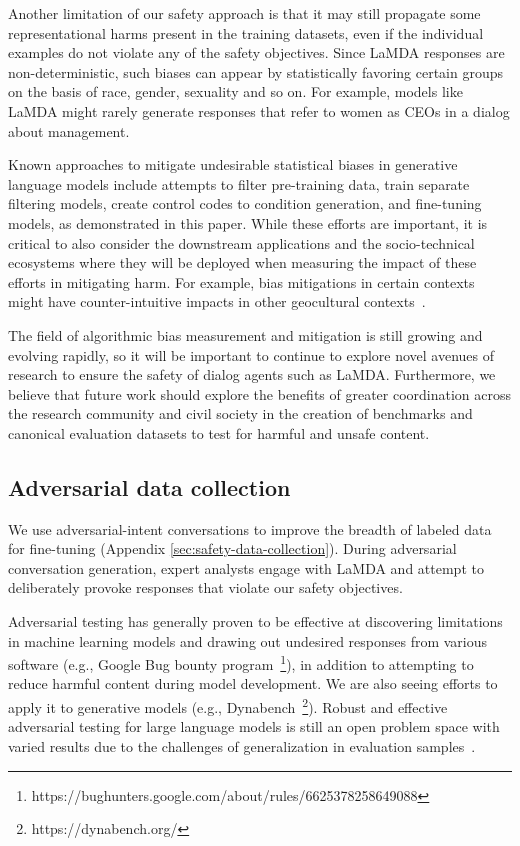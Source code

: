 Another limitation of our safety approach is that it may still propagate some representational harms present in the training datasets, even if the individual examples do not violate any of the safety objectives. Since LaMDA responses are non-deterministic, such biases can appear by statistically favoring certain groups on the basis of race, gender, sexuality and so on. For example, models like LaMDA might rarely generate responses that refer to women as CEOs in a dialog about management.

Known approaches to mitigate undesirable statistical biases in generative language models include attempts to filter pre-training data, train separate filtering models, create control codes to condition generation, and fine-tuning models, as demonstrated in this paper. While these efforts are important, it is critical to also consider the downstream applications and the socio-technical ecosystems where they will be deployed when measuring the impact of these efforts in mitigating harm. For example, bias mitigations in certain contexts might have counter-intuitive impacts in other geocultural contexts~\cite{sambasivan2021reimagining}.

The field of algorithmic bias measurement and mitigation is still growing and evolving rapidly, so it will be important to continue to explore novel avenues of research to ensure the safety of dialog agents such as LaMDA. Furthermore, we believe that future work should explore the benefits of greater coordination across the research community and civil society in the creation of benchmarks and canonical evaluation datasets to test for harmful and unsafe content. 

\subsection{Adversarial data collection} We use adversarial-intent conversations to improve the breadth of labeled data for fine-tuning (Appendix \ref{sec:safety-data-collection}). During adversarial conversation generation, expert analysts engage with LaMDA and attempt to deliberately provoke responses that violate our safety objectives.

Adversarial testing has generally proven to be effective at discovering limitations in machine learning models and drawing out undesired responses from various software (e.g., Google Bug bounty program~\footnote{https://bughunters.google.com/about/rules/6625378258649088}), in addition to attempting to reduce harmful content during model development. We are also seeing efforts to apply it to generative models (e.g., Dynabench~\footnote{https://dynabench.org/}). Robust and effective adversarial testing for large language models is still an open problem space with varied results due to the challenges of generalization in evaluation samples~\cite{liu2020adversarial}.  

